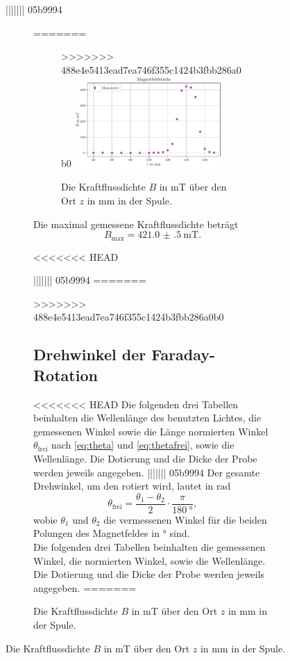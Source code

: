 \begin{figure}[H]
||||||| 05b9994


\begin{figure}
=======
\begin{figure}[H]
>>>>>>> 488e4e5413ead7ea746f355c1424b3fbb286a0b0
    \centering
    \includegraphics[width=0.8\textwidth]{plots/magnetfeld.pdf}
    \caption{Die Kraftflussdichte $B$ in $\si{\milli\tesla}$ über den Ort $z$ in $\si{\milli\meter}$ in der Spule.}
    \label{fig:magnetfeld}
\end{figure}
Die maximal gemessene Kraftflussdichte beträgt
\begin{equation*}
    B_\text{max} = \qty{421.0(5)}{\milli\tesla}.
\end{equation*}

<<<<<<< HEAD

||||||| 05b9994
=======

>>>>>>> 488e4e5413ead7ea746f355c1424b3fbb286a0b0
\subsection{Drehwinkel der Faraday-Rotation}
<<<<<<< HEAD
Die folgenden drei Tabellen beinhalten die Wellenlänge des benutzten Lichtes, die gemessenen Winkel sowie die Länge normierten Winkel $\theta_\text{frei}$ nach \autoref{eq:theta} und \autoref{eq:thetafrei}, sowie die Wellenlänge. Die Dotierung und die Dicke der Probe werden jeweils angegeben.
||||||| 05b9994
Der gesamte Drehwinkel, um den rotiert wird, lautet in $\si{\radian}$
\begin{equation*}
    \theta_\text{frei} = \frac{\theta_1-\theta_2}{2} \cdot \frac{\pi}{\qty{180}{\degree}},
\end{equation*} 
wobie $\theta_1$ und $\theta_2$ die vermessenen Winkel für die beiden Polungen des Magnetfeldes in $\si{\degree}$ sind.\\
Die folgenden drei Tabellen beinhalten die gemessenen Winkel, die normierten Winkel, sowie die Wellenlänge. Die Dotierung und die Dicke der Probe werden jeweils angegeben.
=======


\end{figure}
\end{figure}
